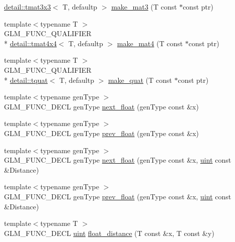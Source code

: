 \begin{DoxyCompactItemize}
\hyperlink{structglm_1_1detail_1_1tmat3x3}{detail\-::tmat3x3}$<$ T, defaultp $>$ \hyperlink{group__gtc__type__ptr_gae50ecac46eb8771fb074e310b602bf53}{make\-\_\-mat3} (T const $\ast$const ptr)
\item 
{\footnotesize template$<$typename T $>$ }\\G\-L\-M\-\_\-\-F\-U\-N\-C\-\_\-\-Q\-U\-A\-L\-I\-F\-I\-E\-R \\*
\hyperlink{structglm_1_1detail_1_1tmat4x4}{detail\-::tmat4x4}$<$ T, defaultp $>$ \hyperlink{group__gtc__type__ptr_gac3920fd61f0c459a4749b8eb9107982c}{make\-\_\-mat4} (T const $\ast$const ptr)
\item 
{\footnotesize template$<$typename T $>$ }\\G\-L\-M\-\_\-\-F\-U\-N\-C\-\_\-\-Q\-U\-A\-L\-I\-F\-I\-E\-R \\*
\hyperlink{structglm_1_1detail_1_1tquat}{detail\-::tquat}$<$ T, defaultp $>$ \hyperlink{group__gtc__type__ptr_ga051ec24a44af31a08b11eccbf8726b02}{make\-\_\-quat} (T const $\ast$const ptr)
\item 
{\footnotesize template$<$typename gen\-Type $>$ }\\G\-L\-M\-\_\-\-F\-U\-N\-C\-\_\-\-D\-E\-C\-L gen\-Type \hyperlink{group__gtc__ulp_gae516ae554faa6117660828240e8bdaf0}{next\-\_\-float} (gen\-Type const \&x)
\item 
{\footnotesize template$<$typename gen\-Type $>$ }\\G\-L\-M\-\_\-\-F\-U\-N\-C\-\_\-\-D\-E\-C\-L gen\-Type \hyperlink{group__gtc__ulp_ga2fcbb7bfbfc595712bfddc51b0715b07}{prev\-\_\-float} (gen\-Type const \&x)
\item 
{\footnotesize template$<$typename gen\-Type $>$ }\\G\-L\-M\-\_\-\-F\-U\-N\-C\-\_\-\-D\-E\-C\-L gen\-Type \hyperlink{group__gtc__ulp_gad107ec3d9697ef82032a33338a73ebdd}{next\-\_\-float} (gen\-Type const \&x, \hyperlink{group__core__precision_ga4fd29415871152bfb5abd588334147c8}{uint} const \&Distance)
\item 
{\footnotesize template$<$typename gen\-Type $>$ }\\G\-L\-M\-\_\-\-F\-U\-N\-C\-\_\-\-D\-E\-C\-L gen\-Type \hyperlink{group__gtc__ulp_gaa399d5b6472a70e8952f9b26ecaacdec}{prev\-\_\-float} (gen\-Type const \&x, \hyperlink{group__core__precision_ga4fd29415871152bfb5abd588334147c8}{uint} const \&Distance)
\item 
{\footnotesize template$<$typename T $>$ }\\G\-L\-M\-\_\-\-F\-U\-N\-C\-\_\-\-D\-E\-C\-L \hyperlink{group__core__precision_ga4fd29415871152bfb5abd588334147c8}{uint} \hyperlink{group__gtc__ulp_ga2e09bd6c8b0a9c91f6f5683d68245634}{float\-\_\-distance} (T const \&x, T const \&y)

\end{DoxyCompactItemize}
